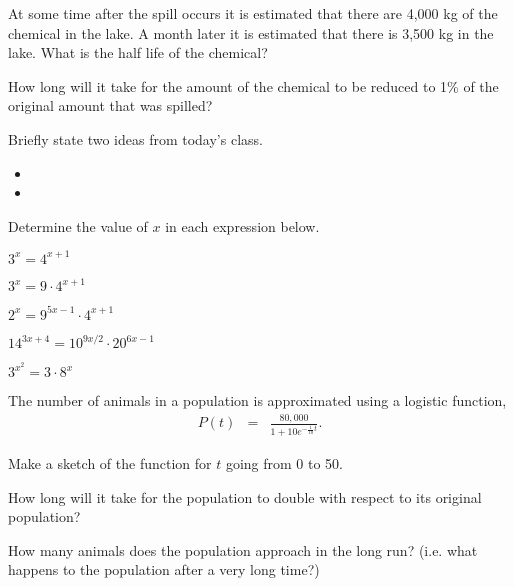 \begin{problem}
\begin{subproblem}
  \item At some time after the spill occurs it is estimated that there
    are 4,000 kg of the chemical in the lake. A month later it is
    estimated that there is 3,500 kg in the lake. What is the half
    life of the chemical?  \vfill

  \item How long will it take for the amount of the chemical to be
    reduced to 1\% of the original amount that was spilled?
    \vfill
  \end{subproblem}

\end{problem}

\postClass

\begin{problem}
\item Briefly state two ideas from today's class.
  \begin{itemize}
  \item
  \item
  \end{itemize}
\item Determine the value of $x$ in each expression below.
  \begin{subproblem}
    \item $3^x = 4^{x+1}$
    \item $3^x = 9\cdot 4^{x+1}$
    \item $2^x = 9^{5x-1}\cdot 4^{x+1}$
    \item $14^{3x+4} = 10^{9x/2}\cdot 20^{6x-1}$
    \item $3^{x^2} = 3 \cdot 8^x$
  \end{subproblem}
\item The number of animals in a population is approximated using a
  logistic function,
  \begin{eqnarray*}
    P(t) & = & \frac{80,000}{1+10e^{-\frac{1}{10}t}}.
  \end{eqnarray*}
  \begin{subproblem}
  \item Make a sketch of the function for $t$ going from 0 to 50.
  \item How long will it take for the population to double with
    respect to its original population?
  \item How many animals does the population approach in the long run?
    (i.e. what happens to the population after a very long time?)
  \end{subproblem}
\end{problem}


